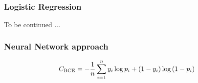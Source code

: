    \subsubsection*{Logistic Regression}
    To be continued ...

    \subsubsection*{Neural Network approach}
    \cite{BCE}
    \begin{align}
        {C}_\text{BCE} = -\frac{1}{n}\sum_{i=1}^{n} y_i \log{p_i} + (1-y_i) \log{(1-p_i)}
    \end{align}